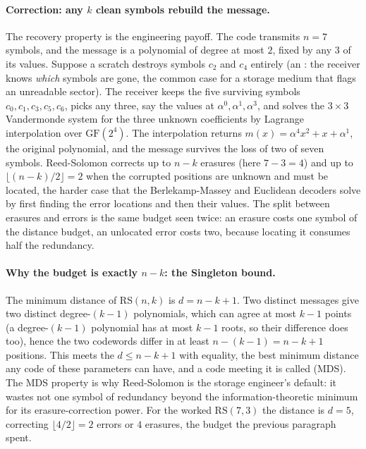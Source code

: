 \paragraph{Correction: any \texorpdfstring{$k$}{k} clean symbols
rebuild the message.}
The recovery property is the engineering payoff. The code transmits
$n = 7$ symbols, and the message is a polynomial of degree at most
$2$, fixed by any $3$ of its values. Suppose a scratch destroys
symbols $c_{2}$ and $c_{4}$ entirely (an : the
receiver knows \emph{which} symbols are gone, the common case for a
storage medium that flags an unreadable sector). The receiver keeps
the five surviving symbols $c_{0}, c_{1}, c_{3}, c_{5}, c_{6}$, picks
any three, say the values at $\alpha^{0}, \alpha^{1}, \alpha^{3}$, and
solves the $3 \times 3$ Vandermonde system for the three unknown
coefficients by Lagrange interpolation over $\mathrm{GF}(2^{4})$. The
interpolation returns $m(x) = \alpha^{4} x^{2} + x + \alpha^{1}$, the
original polynomial, and the message survives the loss of two of seven
symbols. Reed-Solomon corrects up to $n - k$ erasures (here $7 - 3 =
4$) and up to $\lfloor (n - k)/2 \rfloor = 2$  when
the corrupted positions are unknown and must be located, the harder
case that the Berlekamp-Massey and Euclidean decoders solve by first
finding the error locations and then their values. The split between
erasures and errors is the same budget seen twice: an erasure costs
one symbol of the distance budget, an unlocated error costs two,
because locating it consumes half the redundancy.

\paragraph{Why the budget is exactly \texorpdfstring{$n - k$}{n-k}:
the Singleton bound.}
The minimum distance of $\mathrm{RS}(n, k)$ is $d = n - k + 1$. Two
distinct messages give two distinct degree-$(k-1)$ polynomials, which
can agree at most $k - 1$ points (a degree-$(k-1)$ polynomial has at
most $k - 1$ roots, so their difference does too), hence the two
codewords differ in at least $n - (k - 1) = n - k + 1$ positions.
This meets the  $d \leq n - k + 1$ with
equality, the best minimum distance any code of these parameters can
have, and a code meeting it is called  (MDS). The MDS property is why Reed-Solomon is the storage
engineer's default: it wastes not one symbol of redundancy beyond the
information-theoretic minimum for its erasure-correction power. For
the worked $\mathrm{RS}(7, 3)$ the distance is $d = 5$, correcting
$\lfloor 4/2 \rfloor = 2$ errors or $4$ erasures, the budget the
previous paragraph spent.

